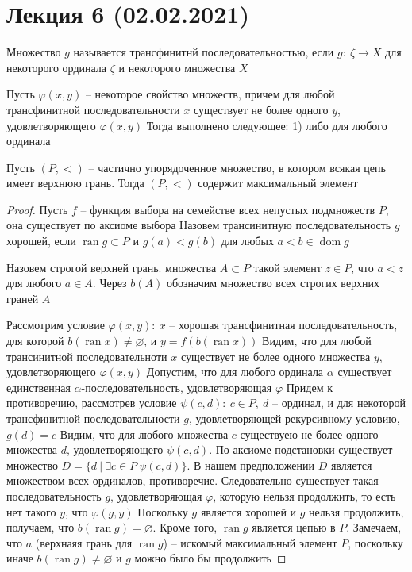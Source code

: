 \section{Лекция 6 (02.02.2021)}

\begin{defn}
Множество $g$ называется трансфинитнй последовательностью, если $g:\ \zeta \to X$ для некоторого ординала $\zeta$ и некоторого множества $X$
\end{defn}

\begin{theo}
Пусть $\varphi(x,y)$ -- некоторое свойство множеств, причем для любой трансфинитной последовательности $x$ существует не более одного $y$, удовлетворяющего $\varphi(x,y)$
\vskip 0.1in
Тогда выполнено следующее:
1) либо для любого ординала 
\end{theo}

\begin{theo}[Цорн]
Пусть $(P,<)$ -- частично упорядоченное множество, в котором всякая цепь имеет верхнюю грань. Тогда $(P,<)$ содержит максимальный элемент
\end{theo}
\begin{proof}
Пусть $f$ -- функция выбора на семействе всех непустых подмножеств $P$, она существует по аксиоме выбора
\vskip 0.1in
Назовем трансинитную последовательность $g$ хорошей, если $\operatorname{ran} g \subset P$ и $g(a) < g(b)$ для любых $a < b \in \operatorname{dom} g$

\begin{defn}
Назовем строгой верхней грань. множества $A \subset P$ такой элемент $z \in P$, что $a < z$ для любого $a \in A$. Через $b(A)$ обозначим множество всех строгих верхних граней $A$
\end{defn}

Рассмотрим условие $\varphi(x,y):\ x$ -- хорошая трансфинитная последовательность, для которой $b(\operatorname{ran} x) \ne \varnothing$, и $y = f(b(\operatorname{ran} x))$
\vskip 0.1in
Видим, что для любой трансинитной последовательноти $x$ существует не более одного множества $y$, удовлетворяющего $\varphi(x,y)$
\vskip 0.1in
Допустим, что для любого ординала $\alpha$ существует единственная $\alpha$-последовательность, удовлетворяющая $\varphi$
\vskip 0.1in
Придем к противоречию, рассмотрев условие $\psi(c,d):\ c \in P,\ d$ -- ординал, и для некоторой трансфинитной последовательности $g$, удовлетворяющей рекурсивному условию, $g(d) = c$
\vskip 0.1in
Видим, что для любого множества $c$ существуею не более одного множества $d$, удовлетворяющего $\psi(c,d)$. По аксиоме подстановки существует множество $D = \{d\ |\ \exists c \in P\ \psi(c,d)\}$. В нашем предположении $D$ является множеством всех ординалов, противоречие.
\vskip 0.1in
Следовательно существует такая последовательность $g$, удовлетворяющая $\varphi$, которую нельзя продолжить, то есть нет такого $y$, что $\varphi(g,y)$
\vskip 0.1in
Поскольку $g$ является хорошей и $g$ нельзя продолжить, получаем, что $b(\operatorname{ran} g) = \varnothing$. Кроме того, $\operatorname{ran} g$ является цепью в $P$. Замечаем, что $a$ (верхнаяя грань для $\operatorname{ran} g$) -- искомый максимальный элемент $P$, поскольку иначе $b(\operatorname{ran} g) \ne \varnothing$ и $g$ можно было бы продолжить
\end{proof}

